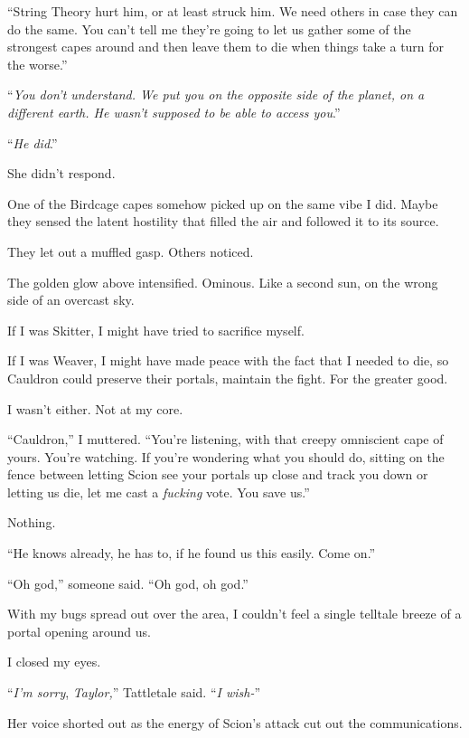 ``String Theory hurt him, or at least struck him.  We need others in case they can do the same.  You can't tell me they're going to let us gather some of the strongest capes around and then leave them to die when things take a turn for the worse.''



``\emph{You don't understand.  We put you on the opposite side of the planet, on a different earth.  He wasn't supposed to be able to access you}.''



``\emph{He did}.''



She didn't respond.



One of the Birdcage capes somehow picked up on the same vibe I did.  Maybe they sensed the latent hostility that filled the air and followed it to its source.



They let out a muffled gasp.  Others noticed.



The golden glow above intensified.  Ominous.  Like a second sun, on the wrong side of an overcast sky.



If I was Skitter, I might have tried to sacrifice myself.



If I was Weaver, I might have made peace with the fact that I needed to die, so Cauldron could preserve their portals, maintain the fight.  For the greater good.



I wasn't either.  Not at my core.



``Cauldron,'' I muttered.  ``You're listening, with that creepy omniscient cape of yours.  You're watching.  If you're wondering what you should do, sitting on the fence between letting Scion see your portals up close and track you down or letting us die, let me cast a \emph{fucking }vote.  You save us.''



Nothing.



``He knows already, he has to, if he found us this easily.  Come on.''



``Oh god,'' someone said.  ``Oh god, oh god.''



With my bugs spread out over the area, I couldn't feel a single telltale breeze of a portal opening around us.



I closed my eyes.



``\emph{I'm sorry}, \emph{Taylor,}'' Tattletale said.  ``\emph{I wish-}''



Her voice shorted out as the energy of Scion's attack cut out the communications.






